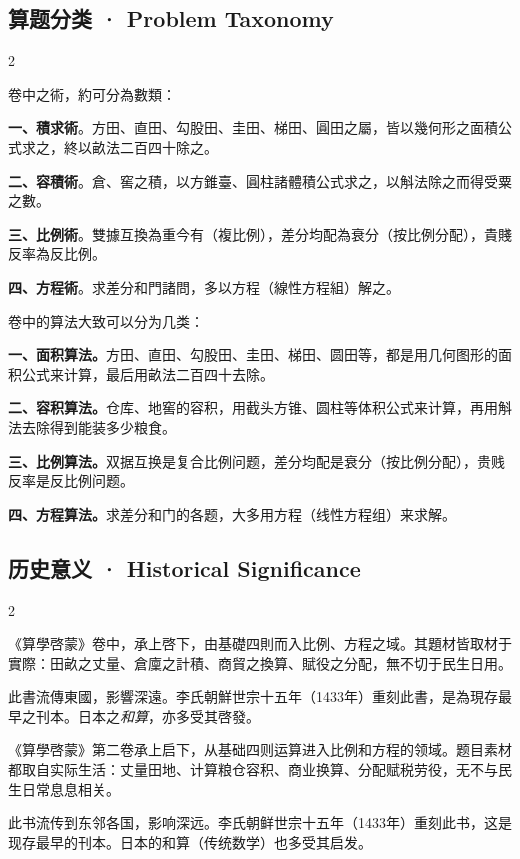 \documentclass[11pt,a4paper]{article}
\begin{document}
\subsection{算题分类 · Problem Taxonomy}

\begin{paracol}{2}
\begin{leftcolumn}
卷中之術，約可分為數類：

\textbf{一、積求術}。方田、直田、勾股田、圭田、梯田、圓田之屬，皆以幾何形之面積公式求之，終以畝法二百四十除之。

\textbf{二、容積術}。倉、窖之積，以方錐臺、圓柱諸體積公式求之，以斛法除之而得受粟之數。

\textbf{三、比例術}。雙據互換為重今有（複比例），差分均配為衰分（按比例分配），貴賤反率為反比例。

\textbf{四、方程術}。求差分和門諸問，多以方程（線性方程組）解之。
\end{leftcolumn}
\begin{rightcolumn}
卷中的算法大致可以分为几类：

\textbf{一、面积算法。}方田、直田、勾股田、圭田、梯田、圆田等，都是用几何图形的面积公式来计算，最后用畝法二百四十去除。

\textbf{二、容积算法。}仓库、地窖的容积，用截头方锥、圆柱等体积公式来计算，再用斛法去除得到能装多少粮食。

\textbf{三、比例算法。}双据互换是复合比例问题，差分均配是衰分（按比例分配），贵贱反率是反比例问题。

\textbf{四、方程算法。}求差分和门的各题，大多用方程（线性方程组）来求解。
\end{rightcolumn}
\end{paracol}

\vspace{0.5em}

\subsection{历史意义 · Historical Significance}

\begin{paracol}{2}
\begin{leftcolumn}
《算學啓蒙》卷中，承上啓下，由基礎四則而入比例、方程之域。其題材皆取材于實際：田畝之丈量、倉廩之計積、商貿之換算、賦役之分配，無不切于民生日用。

此書流傳東國，影響深遠。李氏朝鮮世宗十五年（1433年）重刻此書，是為現存最早之刊本。日本之\textit{和算}，亦多受其啓發。
\end{leftcolumn}
\begin{rightcolumn}
《算學啓蒙》第二卷承上启下，从基础四则运算进入比例和方程的领域。题目素材都取自实际生活：丈量田地、计算粮仓容积、商业换算、分配赋税劳役，无不与民生日常息息相关。

此书流传到东邻各国，影响深远。李氏朝鲜世宗十五年（1433年）重刻此书，这是现存最早的刊本。日本的和算（传统数学）也多受其启发。
\end{rightcolumn}
\end{paracol}
\end{document}
